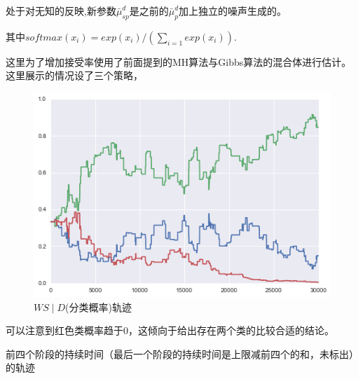 \documentclass[UTF8]{ctexart}
\begin{document}
处于对无知的反映,新参数$\bar{\mu}^d_{sp}$是之前的$\bar{\mu}^d_{p}$加上独立的噪声生成的。

其中$softmax(x_i)=exp(x_i)/(\sum_{i=1} exp(x_i))$.



这里为了增加接受率使用了前面提到的MH算法与Gibbs算法的混合体进行估计。这里展示的情况设了三个策略，

\begin{figure}[H]
\centering
\includegraphics[width=\linewidth]{images/classific3.png}
\caption{$WS \mid D$(分类概率)轨迹}
\end{figure}

可以注意到红色类概率趋于0，这倾向于给出存在两个类的比较合适的结论。

前四个阶段的持续时间（最后一个阶段的持续时间是上限减前四个的和，未标出）的轨迹
\end{document}
